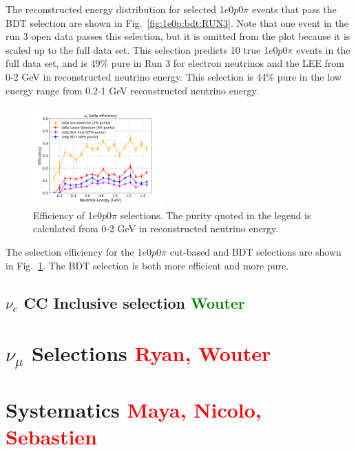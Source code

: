\documentclass[a4paper]{article}
\newcommand{\zpsel}{1$e$0$p$0$\pi$ }
\begin{document}
The reconstructed energy distribution for selected \zpsel events that pass the BDT selection are shown in Fig.~\ref{fig:1e0p:bdt:RUN3}.  Note that one event in the run 3 open data passes this selection, but it is omitted from the plot because it is scaled up to the full data set.  This selection predicts 10 true \zpsel events in the full data set, and is 49\% pure in Run 3 for electron neutrinos and the LEE from 0-2 GeV in reconstructed neutrino energy.  This selection is 44\% pure in the low energy range from 0.2-1 GeV reconstructed neutrino energy.   

\begin{figure}[H]
\begin{center}
\includegraphics[width=0.45\textwidth]{1e0p/efficiency_RUN3.pdf}
\caption{\label{fig:1e0p:eff:RUN3} Efficiency of \zpsel selections.  The purity quoted in the legend is calculated from 0-2 GeV in reconstructed neutrino energy.}
\end{center}
\end{figure}

The selection efficiency for the \zpsel cut-based and BDT selections are shown in Fig.~\ref{fig:1e0p:eff:RUN3}.  The BDT selection is both more efficient and more pure. 

\clearpage

\subsection{$\nu_e$ CC Inclusive selection \textcolor{green}{Wouter}}

\clearpage

\section{$\nu_{\mu}$ Selections \textcolor{red}{Ryan, Wouter}}
\label{sec:numuselection}

\clearpage

\section{Systematics \textcolor{red}{Maya, Nicolo, Sebastien}}
\label{sec:systematics}
\end{document}
